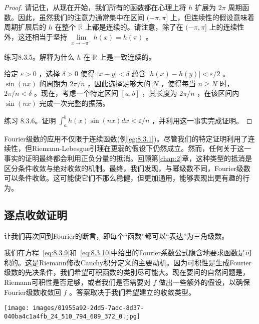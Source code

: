 \begin{proof}
  请记住，从现在开始，我们所有的函数都在心理上将 \(h\) 扩展为 \({2\pi }\) 周期函数。因此，虽然我们的注意力通常集中在区间 \(( - \pi ,\pi \rbrack\) 上，但连续性的假设意味着周期扩展后的 \(h\) 在整个 \(\mathbb{R}\) 上都是连续的。请注意，除了在 \(( - \pi ,\pi \rbrack\) 上的连续性外，这还相当于坚持 \(\mathop{\lim }\limits_{{x \rightarrow   - {\pi }^{ + }}}h\left( x\right)  = h\left( \pi \right)\) 。

  
练习8.3.5。解释为什么 \(h\) 在 \(\mathbb{R}\) 上是一致连续的。

给定 \(\varepsilon  > 0\) ，选择 \(\delta  > 0\) 使得 \(\left| {x - y}\right|  < \delta\) 蕴含 \(\left| {h\left( x\right)  - h\left( y\right) }\right|  < \varepsilon /2\) 。 \(\sin \left( {nx}\right)\) 的周期为 \({2\pi }/n\) ，因此选择足够大的 \(N\) ，使得每当 \(n \geq  N\) 时， \({2\pi }/n < \delta\) 。现在，考虑一个特定区间 \(\left\lbrack  {a,b}\right\rbrack\) ，其长度为 \({2\pi }/n\) ，在该区间内 \(\sin \left( {nx}\right)\) 完成一次完整的振荡。

练习 8.3.6。证明 \({\int }_{a}^{b}h\left( x\right) \sin \left( {nx}\right) {dx} < \varepsilon /n\) ，并利用这一事实完成证明。
\end{proof}



Fourier级数的应用不仅限于连续函数(例\ref{eg:8.3.1})。尽管我们的特定证明利用了连续性，但Riemann-Lebesgue引理在更弱的假设下仍然成立。然而，任何关于这一事实的证明最终都会利用正负分量的抵消。回顾第\ref{chap:2}章，这种类型的抵消是区分条件收敛与绝对收敛的机制。最终，我们发现，与幂级数不同，Fourier级数可以条件收敛。这可能使它们不那么稳健，但更加通用，能够表现出更有趣的行为。

\subsection{逐点收敛证明}

让我们再次回到Fourier的断言，即每个“函数”都可以“表达”为三角级数。

我们在方程~\eqref{eq:8.3.9}和~\eqref{eq:8.3.10}中给出的Fourier系数公式隐含地要求函数是可积的。这是Riemann修改Cauchy积分定义的主要动机。因为可积性是生成Fourier级数的先决条件，我们希望可积函数的类别尽可能大。现在要问的自然问题是，Riemann可积性是否足够，或者我们是否需要对 \(f\) 做出一些额外的假设，以确保Fourier级数收敛回 \(f\) 。答案取决于我们希望建立的收敛类型。

\begin{center}
\texttt{[image: images/01955a92-2dd5-7adc-8d37-040ba4c1a4fb\_24\_510\_794\_689\_372\_0.jpg]}
\end{center}
\hspace*{3em} 

